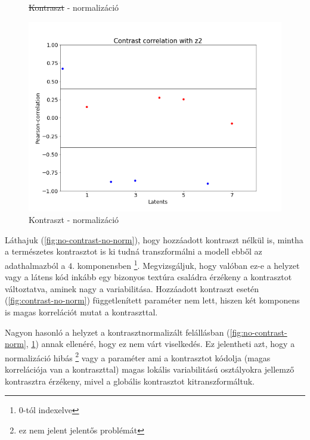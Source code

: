 \documentclass[12pt, english]{article}
\begin{document}
\begin{figure}[H]
\begin{minipage}{0.5\linewidth}
    \caption{\st{Kontraszt} - normalizáció} 
    \label{fig:no-contrast-norm}
  \end{minipage}%
  \begin{minipage}{0.5\linewidth}
    \centering
    \includegraphics[width=.72\linewidth]{contrast_to_latent/norm_contrast_correlation.png} 
    \caption{Kontraszt - normalizáció} 
    \label{fig:contrast-norm}
  \end{minipage} 
\end{figure}

\vspace{4mm}

\par Láthajuk (\ref{fig:no-contrast-no-norm}), hogy hozzáadott kontraszt nélkül is, mintha a természetes kontrasztot is ki tudná transzformálni a modell ebből az adathalmazból a $4.$ komponensben \footnote{$0$-tól indexelve}. Megvizsgáljuk, hogy valóban ez-e a helyzet vagy a látens kód inkább egy bizonyos textúra családra érzékeny a kontrasztot változtatva, aminek nagy a variabilitása. Hozzáadott kontraszt esetén (\ref{fig:contrast-no-norm}) függetlenített paraméter nem lett, hiszen két komponens is magas korrelációt mutat a kontraszttal.

\vspace{4mm}

\par Nagyon hasonló a helyzet a kontrasztnormalizált felállásban (\ref{fig:no-contrast-norm}, \ref{fig:contrast-norm}) annak ellenéré, hogy ez nem várt viselkedés. Ez jelentheti azt, hogy a normalizáció hibás \footnote{ez nem jelent jelentős problémát} vagy a paraméter ami a kontrasztot kódolja (magas korrelációja van a kontraszttal) magas lokális variabilitású osztályokra jellemző kontrasztra érzékeny, mivel a globális kontrasztot kitranszformáltuk.

\vspace{4mm}
\end{document}
